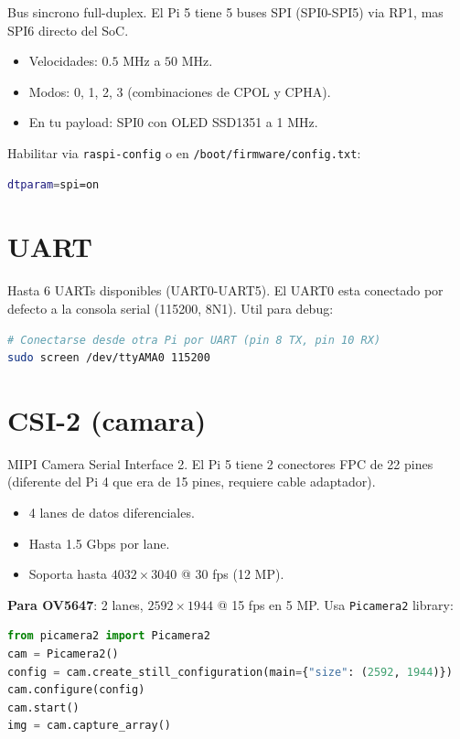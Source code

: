 \documentclass[11pt,a4paper,oneside]{report}
\begin{document}
Bus sincrono full-duplex. El Pi 5 tiene 5 buses SPI (SPI0-SPI5) via RP1,
mas SPI6 directo del SoC.

\begin{itemize}[leftmargin=2em]
  \item Velocidades: $0.5$ MHz a $50$ MHz.
  \item Modos: 0, 1, 2, 3 (combinaciones de CPOL y CPHA).
  \item En tu payload: SPI0 con OLED SSD1351 a 1 MHz.
\end{itemize}

Habilitar via \texttt{raspi-config} o en \texttt{/boot/firmware/config.txt}:
\begin{lstlisting}[language=bash]
dtparam=spi=on
\end{lstlisting}

\section{UART}

Hasta 6 UARTs disponibles (UART0-UART5). El UART0 esta conectado por defecto
a la consola serial (115200, 8N1). Util para debug:

\begin{lstlisting}[language=bash]
# Conectarse desde otra Pi por UART (pin 8 TX, pin 10 RX)
sudo screen /dev/ttyAMA0 115200
\end{lstlisting}

\section{CSI-2 (camara)}

MIPI Camera Serial Interface 2. El Pi 5 tiene 2 conectores FPC de 22 pines
(diferente del Pi 4 que era de 15 pines, requiere cable adaptador).

\begin{itemize}[leftmargin=2em]
  \item 4 lanes de datos diferenciales.
  \item Hasta 1.5 Gbps por lane.
  \item Soporta hasta $4032 \times 3040$ @ 30 fps (12 MP).
\end{itemize}

\textbf{Para OV5647}: 2 lanes, $2592 \times 1944$ @ 15 fps en 5 MP. Usa
\texttt{Picamera2} library:

\begin{lstlisting}[language=python]
from picamera2 import Picamera2
cam = Picamera2()
config = cam.create_still_configuration(main={"size": (2592, 1944)})
cam.configure(config)
cam.start()
img = cam.capture_array()
\end{lstlisting}
\end{document}
